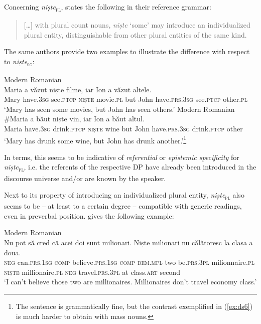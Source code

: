 \documentclass[output=paper,colorlinks,citecolor=brown]{langscibook}
\begin{document}
Concerning \textit{niște}\textsc{\textsubscript{\textsc{pl}}}, \citet[65]{Dobrovie-SorinGiurgea2013} states the following in their reference grammar:

\begin{quote}
[…] with plural count nouns, \textit{niște} ‘some’ may introduce an individualized plural entity, distinguishable from other plural entities of the same kind.
\end{quote}

The same authors provide two examples to illustrate the difference with respect to \textit{niște}\textsc{\textsubscript{sg}}:\largerpage[-1]\pagebreak

\ea\label{ex:ds6} Modern Romanian\\
\gll Maria a v\u{a}zut niște filme, iar Ion a v\u{a}zut altele.\\
     Mary have.3\textsc{sg} see.\textsc{ptcp} \textsc{niște} movie.\textsc{pl} but John have.\textsc{prs.3sg} see.\textsc{ptcp}  other.\textsc{pl}\\
\glt ‘Mary has seen some movies, but John has seen others.’
\ex\label{ex:ds7} Modern Romanian\\
\gll \#Maria a b\u{a}ut niște vin, iar Ion a b\u{a}ut altul.\\
     Maria have.3\textsc{sg} drink.\textsc{ptcp} \textsc{niște} wine but John have.\textsc{prs.3sg} drink.\textsc{ptcp} other\\
\glt ‘Mary has drunk some wine, but John has drunk another.’\footnote{The sentence is grammatically fine, but the contrast exemplified in (\ref{ex:ds6}) is much harder to obtain with mass nouns.}
\z

In  terms, this seems to be indicative of \textit{referential} or \textit{epistemic specificity} for \textit{niște}\textsc{\textsubscript{\textsc{pl}}}, i.e. the referents of the respective DP have already been introduced in the discourse universe and/or are known by the speaker.

\begin{sloppypar}
Next to its property of introducing an individualized plural entity, \textit{niște}\textsubscript{\textsc{pl}} also seems to be -- at least to a certain degree -- compatible with generic readings, even in preverbal position. \citet[207]{Nedelcu2009} gives the following example:
\end{sloppypar}

\ea\label{ex:ds8} {Modern Romanian}\\
\gll Nu pot s\u{a} cred c\u{a} acei doi sunt milionari. Niște milionari nu c\u{a}l\u{a}toresc la clasa a doua.\\
\textsc{neg} can.\textsc{prs.1sg} \textsc{comp} believe.\textsc{prs.1sg} \textsc{comp} \textsc{dem.mpl} two be.\textsc{prs.3pl} milionnaire.\textsc{pl} \textsc{niște} millionaire.\textsc{pl} \textsc{neg} travel.\textsc{prs.3pl} at class.\textsc{art} second\\
\glt ‘I can’t believe those two are millionaires. Millionaires don’t travel economy class.’
\z
\end{document}
